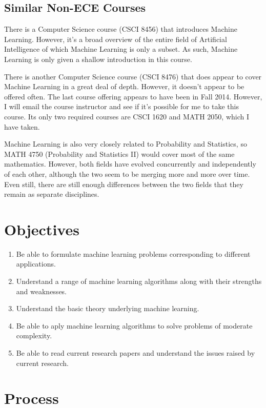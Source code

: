 \documentclass[12pt]{article}
\begin{document}
\subsection{Similar Non-ECE Courses}

There is a Computer Science course (CSCI 8456) that introduces Machine Learning. However, it's a
broad overview of the entire field of Artificial Intelligence of which Machine Learning is only a subset.
As such, Machine Learning is only given a shallow introduction in this course. 

There is another Computer Science course (CSCI 8476) that does appear to cover Machine Learning in a great deal of depth.
However, it doesn't appear to be offered often. The last course offering appears to have been in Fall 2014. However, I will email
the course instructor and see if it's possible for me to take this course. Its only two required courses are CSCI 1620 and MATH
2050, which I have taken.

Machine Learning is also very closely related to Probability and Statistics, so MATH 4750 (Probability and Statistics II) would
cover most of the same mathematics. However, both fields have evolved concurrently and independently of each other, although the
two seem to be merging more and more over time. Even still, there are still enough differences between the two fields that they
remain as separate disciplines.

\section{Objectives}

\begin{enumerate}
\item Be able to formulate machine learning problems corresponding to different applications. 
\item Understand a range of machine learning algorithms along with their strengths and weaknesses. 
\item Understand the basic theory underlying machine learning. 
\item Be able to aply machine learning algorithms to solve problems of moderate complexity. 
\item Be able to read current research papers and understand the issues raised by current research.
\end{enumerate}

\section{Process}
\end{document}
